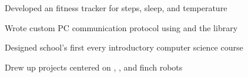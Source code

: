 \documentclass[]{deedy-resume-openfont}
\begin{document}
\begin{minipage}[t]{0.66\textwidth}
\descript{}
\begin{tightemize}
\item Developed an  fitness tracker for steps, sleep, and temperature
\item Wrote custom PC communication protocol using  and the  library
\end{tightemize}
\sectionsep

\descript{}
\begin{tightemize}
\item Designed school's first every introductory computer science course
\item Drew up projects centered on , , and finch robots
\end{tightemize}
\sectionsep


%
%




\end{minipage}
\end{document}
